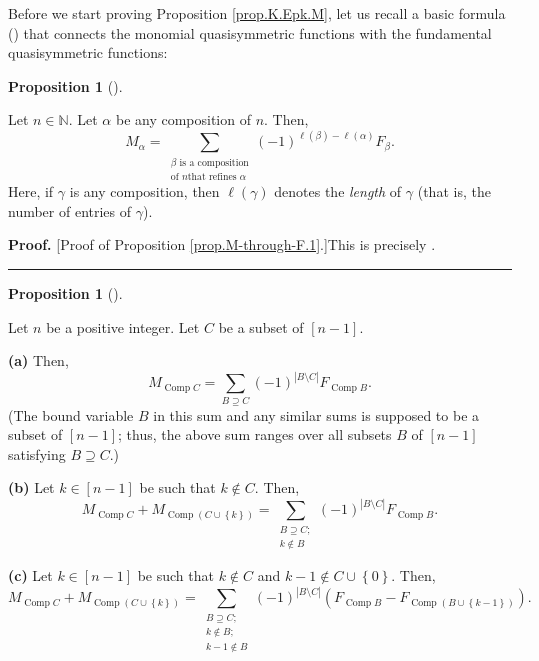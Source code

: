 \documentclass[numbers=enddot,12pt,final,onecolumn,notitlepage]{scrartcl}%
\theoremstyle{definition}
\newtheorem{prop}[theo]{Proposition}
\newenvironment{proposition}[1][]
{\begin{prop}[#1]\begin{leftbar}}
{\end{leftbar}\end{prop}}
\newenvironment{proof}[1][Proof]{\noindent\textbf{#1.} }{\ \rule{0.5em}{0.5em}}
\newenvironment{verlong}{}{}
\let\sumnonlimits\sum
\renewcommand{\sum}{\sumnonlimits\limits}
\begin{document}
\begin{verlong}
Before we start proving Proposition \ref{prop.K.Epk.M}, let us recall a basic
formula (\cite[(5.2.2)]{HopfComb}) that connects the monomial quasisymmetric
functions with the fundamental quasisymmetric functions:

\begin{proposition}
\label{prop.M-through-F.1}Let $n\in\mathbb{N}$. Let $\alpha$ be any
composition of $n$. Then,%
\[
M_{\alpha}=\sum_{\substack{\beta\text{ is a composition}\\\text{of }n\text{
that refines }\alpha}}\left(  -1\right)  ^{\ell\left(  \beta\right)
-\ell\left(  \alpha\right)  }F_{\beta}.
\]
Here, if $\gamma$ is any composition, then $\ell\left(  \gamma\right)  $
denotes the \textit{length} of $\gamma$ (that is, the number of entries of
$\gamma$).
\end{proposition}

\begin{proof}
[Proof of Proposition \ref{prop.M-through-F.1}.]This is
precisely \cite[(5.2.2)]{HopfComb}.
\end{proof}

\begin{proposition}
\label{prop.M-through-F.2}Let $n$ be a positive integer. Let $C$ be a subset
of $\left[  n-1\right]  $.

\textbf{(a)} Then,%
\[
M_{\operatorname*{Comp}C}=\sum_{B\supseteq C}\left(  -1\right)  ^{\left\vert
B\setminus C\right\vert }F_{\operatorname*{Comp}B}.
\]
(The bound variable $B$ in this sum and any similar sums is supposed to be a
subset of $\left[  n-1\right]  $; thus, the above sum ranges over all subsets
$B$ of $\left[  n-1\right]  $ satisfying $B\supseteq C$.)

\textbf{(b)} Let $k\in\left[  n-1\right]  $ be such that $k\notin C$. Then,%
\[
M_{\operatorname*{Comp}C}+M_{\operatorname*{Comp}\left(  C\cup\left\{
k\right\}  \right)  }=\sum_{\substack{B\supseteq C;\\k\notin B}}\left(
-1\right)  ^{\left\vert B\setminus C\right\vert }F_{\operatorname*{Comp}B}.
\]


\textbf{(c)} Let $k\in\left[  n-1\right]  $ be such that $k\notin C$ and
$k-1\notin C\cup\left\{  0\right\}  $. Then,%
\[
M_{\operatorname*{Comp}C}+M_{\operatorname*{Comp}\left(  C\cup\left\{
k\right\}  \right)  }=\sum_{\substack{B\supseteq C;\\k\notin B;\\k-1\notin
B}}\left(  -1\right)  ^{\left\vert B\setminus C\right\vert }\left(
F_{\operatorname*{Comp}B}-F_{\operatorname*{Comp}\left(  B\cup\left\{
k-1\right\}  \right)  }\right)  .
\]


\end{proposition}
\end{verlong}
\end{document}
